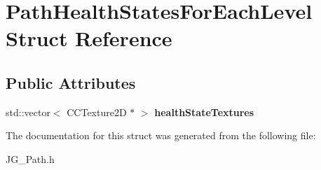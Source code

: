\hypertarget{struct_path_health_states_for_each_level}{\section{Path\-Health\-States\-For\-Each\-Level Struct Reference}
\label{struct_path_health_states_for_each_level}
}
\subsection*{Public Attributes}
\begin{DoxyCompactItemize}
\item 
\hypertarget{struct_path_health_states_for_each_level_a174c4a14b31fa638a721944d5e2db7d9}{std\-::vector$<$ C\-C\-Texture2\-D $\ast$ $>$ {\bfseries health\-State\-Textures}}\label{struct_path_health_states_for_each_level_a174c4a14b31fa638a721944d5e2db7d9}

\end{DoxyCompactItemize}


The documentation for this struct was generated from the following file\-:\begin{DoxyCompactItemize}
\item 
J\-G\-\_\-\-Path.\-h\end{DoxyCompactItemize}
